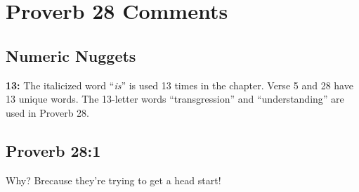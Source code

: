 \section{Proverb 28 Comments}

\subsection{Numeric Nuggets}
\textbf{13:} The italicized word ``\emph{is}'' is used 13 times in the chapter.  Verse 5 and 28 have 13 unique words.  The 13-letter words ``transgression'' and ``understanding'' are used in Proverb 28.

\subsection{Proverb 28:1}
Why? Brecause they're trying to get a head start!

